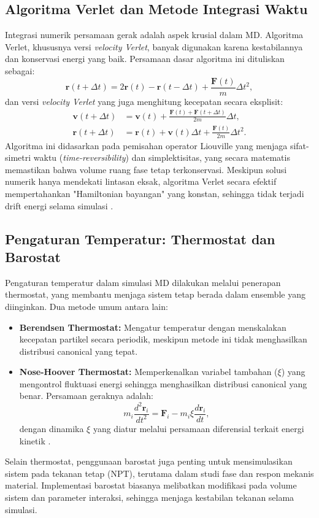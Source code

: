 \subsection{Algoritma Verlet dan Metode Integrasi Waktu}
Integrasi numerik persamaan gerak adalah aspek krusial dalam MD.
Algoritma Verlet, khususnya versi \emph{velocity Verlet}, banyak digunakan karena kestabilannya dan konservasi energi yang baik.
Persamaan dasar algoritma ini dituliskan sebagai:
\begin{equation}
    \mathbf{r}(t+\Delta t) = 2\mathbf{r}(t) - \mathbf{r}(t-\Delta t) + \frac{\mathbf{F}(t)}{m}\Delta t^2,
\end{equation}
dan versi \emph{velocity Verlet} yang juga menghitung kecepatan secara eksplisit:
\begin{align}
    \mathbf{v}(t+\Delta t) &= \mathbf{v}(t) + \frac{\mathbf{F}(t) + \mathbf{F}(t+\Delta t)}{2m}\Delta t, \\
    \mathbf{r}(t+\Delta t) &= \mathbf{r}(t) + \mathbf{v}(t)\Delta t + \frac{\mathbf{F}(t)}{2m}\Delta t^2.
\end{align}
Algoritma ini didasarkan pada pemisahan operator Liouville yang menjaga sifat-simetri waktu (\emph{time-reversibility}) dan simplektisitas, yang secara matematis memastikan bahwa volume ruang fase tetap terkonservasi.
Meskipun solusi numerik hanya mendekati lintasan eksak, algoritma Verlet secara efektif mempertahankan "Hamiltonian bayangan" yang konstan, sehingga tidak terjadi drift energi selama simulasi \citep{Allen1989}.

\subsection{Pengaturan Temperatur: Thermostat dan Barostat}
Pengaturan temperatur dalam simulasi MD dilakukan melalui penerapan thermostat, yang membantu menjaga sistem tetap berada dalam ensemble yang diinginkan.
Dua metode umum antara lain:
\begin{itemize}
    \item \textbf{Berendsen Thermostat:} Mengatur temperatur dengan menskalakan kecepatan partikel secara periodik, meskipun metode ini tidak menghasilkan distribusi canonical yang tepat.
    \item \textbf{Nose-Hoover Thermostat:} Memperkenalkan variabel tambahan (\(\xi\)) yang mengontrol fluktuasi energi sehingga menghasilkan distribusi canonical yang benar.
Persamaan geraknya adalah:
    \begin{equation}
        m_i \frac{d^2 \mathbf{r}_i}{dt^2} = \mathbf{F}_i - m_i \xi \frac{d\mathbf{r}_i}{dt},
    \end{equation}
    dengan dinamika \(\xi\) yang diatur melalui persamaan diferensial terkait energi kinetik \citep{Allen1989}.
\end{itemize}
Selain thermostat, penggunaan barostat juga penting untuk mensimulasikan sistem pada tekanan tetap (NPT), terutama dalam studi fase dan respon mekanis material.
Implementasi barostat biasanya melibatkan modifikasi pada volume sistem dan parameter interaksi, sehingga menjaga kestabilan tekanan selama simulasi.


